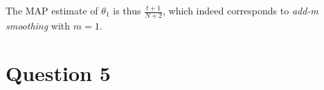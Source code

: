 \documentclass[leqno]{article}
\begin{document}
The MAP estimate of $\theta_1$ is thus $\frac{t + 1}{N + 2}$, which indeed corresponds to \textit{add-m smoothing} with $m = 1$.  


\section*{Question 5}


























\end{document}
